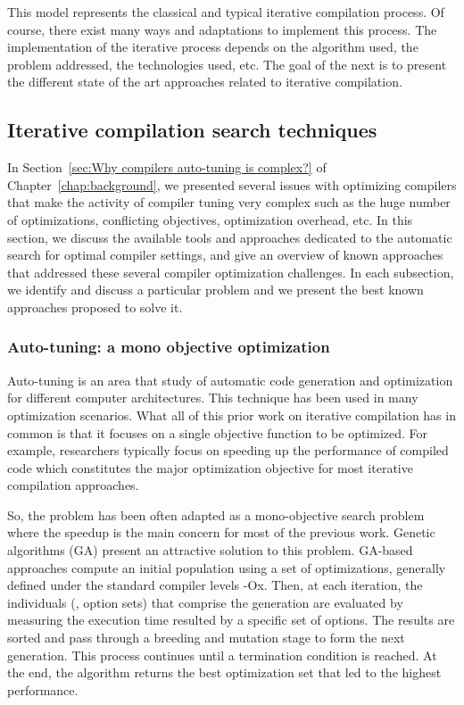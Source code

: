 This model represents the classical and typical iterative compilation process. Of course, there exist many ways and adaptations to implement this process. The implementation of the iterative process depends on the algorithm used, the problem addressed, the technologies used, etc. The goal of the next  is to present the different state of the art approaches related to iterative compilation.

\subsection{Iterative compilation search techniques}
In Section~\ref{sec:Why compilers auto-tuning is complex?} of Chapter~\ref{chap:background}, we presented several issues with optimizing compilers that make the activity of compiler tuning very complex such as the huge number of optimizations, conflicting objectives, optimization overhead, etc.
In this section, we discuss the available tools and approaches dedicated to the automatic search for optimal compiler settings, and give an overview of known approaches that addressed these several compiler optimization challenges. In each subsection, we identify and discuss a particular problem and we present the best known approaches proposed to solve it.

\subsubsection{Auto-tuning: a mono objective optimization}
Auto-tuning is an area that study of automatic code generation and optimization for different computer architectures.
This technique has been used in many optimization scenarios.
What all of this prior work on iterative compilation has in common is that it focuses on a single objective function to be optimized. For example, researchers typically focus on speeding up the performance of compiled code which constitutes the major optimization objective for most iterative compilation approaches\cite{pan2006fast,haneda2005automatic}. 

So, the problem has been often adapted as a mono-objective search problem where the speedup is the main concern for most of the previous work. 
Genetic algorithms (GA)\cite{stephenson2003genetic,bashkansky2007black} present an attractive solution to this problem. 
GA-based approaches compute an initial population using a set of optimizations, generally defined under the standard compiler levels -Ox. Then, at each iteration, the individuals (\ie, option sets) that comprise the generation are evaluated by measuring the execution time resulted by a specific set of options. The results are sorted and pass through a breeding and mutation stage to form the next generation. This
process continues until a termination condition is reached. At the end, the algorithm returns the best optimization set that led to the highest performance.

